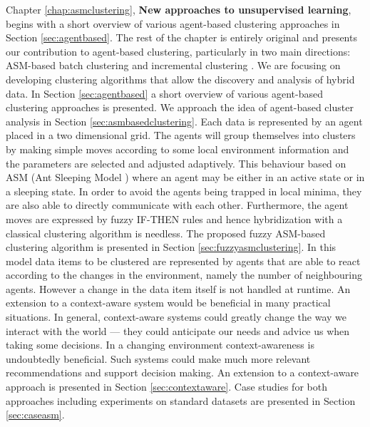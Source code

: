 Chapter \ref{chap:asmclustering}, \textbf{New approaches to unsupervised learning}, begins with a short overview of various agent-based clustering approaches in Section \ref{sec:agentbased}. The rest of the chapter is entirely original and presents our contribution to agent-based clustering, particularly in two main directions: ASM-based batch clustering and incremental clustering \cite{DBSCANIncremental, Kamble, Lee02Inc, Li10Incclust, Li11Training}. We are focusing on developing clustering algorithms that allow the discovery and analysis of hybrid data.
In Section \ref{sec:agentbased} a short overview of various agent-based clustering approaches is presented. 
We approach the idea of agent-based cluster analysis in Section \ref{sec:asmbasedclustering}. Each data is represented by an agent placed in a two dimensional grid. The agents will group themselves into clusters by making simple moves according to some local environment information and the parameters are selected and adjusted adaptively. This behaviour based on ASM (Ant Sleeping Model \cite{Chen04AnAdaptive}) where an agent may be either in an active state or in a sleeping state. In order to avoid the agents being trapped in local minima, they are also able to directly communicate with each other. Furthermore, the agent moves are expressed by fuzzy IF-THEN rules and hence hybridization with a classical clustering algorithm is needless. The proposed fuzzy ASM-based clustering  algorithm is presented in Section \ref{sec:fuzzyasmclustering}. 
In this model data items to be clustered are represented by agents that are able to react according to the changes in the environment, namely the number of neighbouring agents. However a change in the data item itself is not handled at runtime. An extension to a context-aware system would be beneficial in many practical situations. 
In general, context-aware systems could greatly change the way we interact with the world --- they could anticipate our needs and advice us when taking some decisions. In a changing environment context-awareness is undoubtedly beneficial.  Such systems could make much more relevant recommendations and support decision making. An extension to a context-aware approach is presented in Section \ref{sec:contextaware}. Case studies for both approaches including experiments on standard datasets \cite{website:iris, website:wine} are presented in Section \ref{sec:caseasm}.
